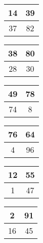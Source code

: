\documentclass[12pt,a4paper]{article}
\begin{document}
\fontsize{310}{250}\selectfont


\begin{tabular}{|c|c|}
\hline  
14 & 39 \\ 
\hline 
37 & 82 \\ 
\hline 
\end{tabular} 

\begin{tabular}{|c|c|}
\hline 
38 & 80 \\ 
\hline 
28 & 30 \\ 
\hline 
\end{tabular} 

\begin{tabular}{|c|c|}
\hline 
49 & 78 \\ 
\hline 
74 & 8 \\ 
\hline 
\end{tabular} 

\begin{tabular}{|c|c|}
\hline 
76 & 64 \\ 
\hline 
4 & 96 \\ 
\hline 
\end{tabular} 

\begin{tabular}{|c|c|}
\hline 
12 & 55 \\ 
\hline 
1 & 47 \\ 
\hline 
\end{tabular} 

\begin{tabular}{|c|c|}
\hline 
2 & 91 \\ 
\hline 
16 & 45 \\ 
\hline 
\end{tabular} 
\end{document}
